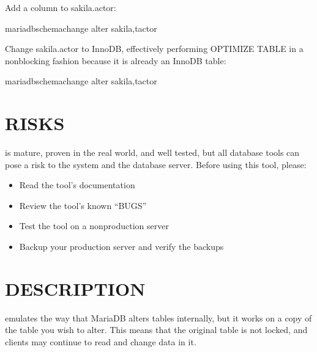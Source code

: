 \documentclass[letterpaper,10pt,english]{sphinxmanual}
\begin{document}
\sphinxAtStartPar
Add a column to sakila.actor:

\begin{sphinxVerbatim}[commandchars=\\\{\}]
mariadb\PYGZhy{}schema\PYGZhy{}change \PYGZhy{}\PYGZhy{}alter  sakila,tactor
\end{sphinxVerbatim}

\sphinxAtStartPar
Change sakila.actor to InnoDB, effectively performing OPTIMIZE TABLE in a
non\sphinxhyphen{}blocking fashion because it is already an InnoDB table:

\begin{sphinxVerbatim}[commandchars=\\\{\}]
mariadb\PYGZhy{}schema\PYGZhy{}change \PYGZhy{}\PYGZhy{}alter  sakila,tactor
\end{sphinxVerbatim}


\section{RISKS}
\label{\detokenize{mariadb-schema-change:risks}}
\sphinxAtStartPar
{} is mature, proven in the real world, and well tested,
but all database tools can pose a risk to the system and the database
server.  Before using this tool, please:
\begin{itemize}
\item {} 
\sphinxAtStartPar
Read the tool’s documentation

\item {} 
\sphinxAtStartPar
Review the tool’s known “BUGS”

\item {} 
\sphinxAtStartPar
Test the tool on a non\sphinxhyphen{}production server

\item {} 
\sphinxAtStartPar
Backup your production server and verify the backups

\end{itemize}


\section{DESCRIPTION}
\label{\detokenize{mariadb-schema-change:description}}
\sphinxAtStartPar
{} emulates the way that MariaDB alters tables internally,
but it works on a copy of the table you wish to alter. This means that the
original table is not locked, and clients may continue to read and change data
in it.
\end{document}
